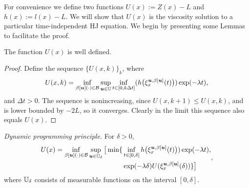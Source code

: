 \begin{for_journal}

For convenience we define two functions ${U(x):=Z(x)-L}$ and ${h(x):=l(x)-L}$. 
We will show that $U(x)$ is the viscosity solution to a particular time-independent HJ equation. We begin by presenting some Lemmas to facilitate the proof.
%
\begin{lemma}
The function $U(x)$ is well defined. 
\end{lemma} 
%
\begin{proof}
Define the sequence $\{U(x,k)\}_k$, where
%
\begin{equation}
U(x,k) = \inf_{\beta[\bm{u}](\cdot) \in \mathcal{B}} \sup_{\bm{u} \in \mathbb{U}} \inf_{t \in [0,k\Delta t]}(h\big(\xi_{x}^{\bm{u},\beta[\bm{u}]}(t)\big))\exp(-\lambda  t),
\end{equation}
%
and $\Delta t>0$. The sequence is nonincreasing, since $U(x,k+1) \leq U(x,k)$, and is lower bounded by $-2L$, so it converges. Clearly in the limit this sequence also equals $U(x)$.
\end{proof}



\begin{lemma} \label{dpp}
\emph{Dynamic programming principle.} For $\delta>0$,
%
\begin{equation}
\begin{split} 
U(x)= \inf_{\beta[\bm{u}](\cdot) \in \mathcal{B}} \sup_{\bm{u} \in \mathbb{U}_\delta} 
\big [
\min\{&\inf_{t \in [0, \delta]} h\big(\xi_{x}^{\bm{u},\beta[\bm{u}]}(t)\big))\exp(-\lambda  t), 
\\&\exp(-\lambda \delta)U(\xi_{x}^{\bm{u},\beta[\bm{u}]}(\delta))\}
\big ]
\end{split},
\end{equation}
%
where $\mathbb{U}_{\delta}$ consists of measurable functions on the interval
$[0,\delta]$.
\end{lemma}


\end{for_journal}
